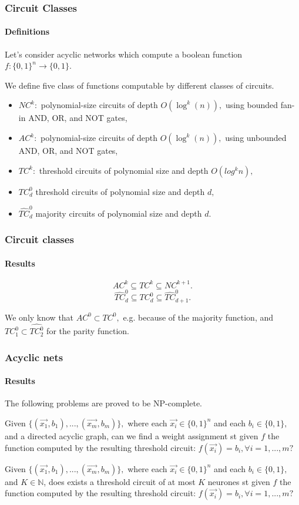 \documentclass{beamer}
\begin{document}
\begin{frame}
\justify
\frametitle{Circuit Classes}
\framesubtitle{Definitions}	
	\justify
	Let's consider acyclic networks which compute a boolean function $f: \{0,1\}^n \to \{0,1\}.$
	\begin{definition}
		\justify
		We define five class of functions computable by different classes of circuits.
		\begin{itemize}
			\item $NC^k: $ polynomial-size circuits of depth $ O(\log ^{k}(n)),$ using bounded fan-in AND, OR, and NOT gates,
			\item $AC^k: $ polynomial-size circuits of depth $ O(\log ^{k}(n)),$ using unbounded AND, OR, and NOT gates,
			\item $TC^k: $ threshold circuits of polynomial size and depth $O(log^k n),$
			\item $TC_d^0$ threshold circuits of polynomial size and depth $d,$
			\item $\widehat{TC}_d^0$ majority circuits of polynomial size and depth $d.$
		\end{itemize}
	\end{definition}
\end{frame}
\begin{frame}
\justify
	\frametitle{Circuit classes}
	\framesubtitle{Results}
	\begin{theorem}
		$$ AC^k \subseteq TC^k \subseteq NC^{k+1}. $$
		\[
			\widehat{TC}_d^0 \subseteq TC_d^0 \subseteq \widehat{TC}_{d+1}^0.
		\]
	\end{theorem}
We only know that $AC^0 \subset TC^0,$ e.g. because of the majority function, and $TC^0_1 \subset \widehat{TC^0_2}$ for the parity function.
\end{frame}

\begin{frame}
\frametitle{Acyclic nets}
\framesubtitle{Results}
The following problems are proved to be NP-complete.
\begin{definition}
	\justify
	Given $\{(\vec{x_1}, b_1),...,(\vec{x_m}, b_m)\},$ where each $\vec{x_i} \in \{0,1\}^n$ and each $b_i \in \{0, 1\},$ and a directed acyclic graph, can we find a weight assignment st given $f$ the function computed by the resulting threshold circuit: $f(\vec{x_i})=b_i, \forall i = 1,...,m ?$
\end{definition}

\begin{definition}
	\justify
	Given $\{(\vec{x_1}, b_1),...,(\vec{x_m}, b_m)\},$ where each $\vec{x_i} \in \{0,1\}^n$ and each $b_i \in \{0, 1\},$ and $K \in \mathbb{N}$, does exists a threshold circuit of at most $K$ neurones st given $f$ the function computed by the resulting threshold circuit: $f(\vec{x_i})=b_i, \forall i = 1,...,m ?$
\end{definition}
\end{frame}
\end{document}
